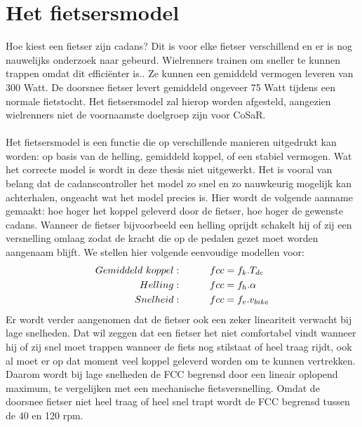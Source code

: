 \section{Het fietsersmodel}
Hoe kiest een fietser zijn cadans? Dit is voor elke fietser verschillend en er is nog nauwelijks onderzoek naar gebeurd. Wielrenners trainen om sneller te kunnen trappen omdat dit efficiënter is.. Ze kunnen een gemiddeld vermogen leveren van 300 Watt. De doorsnee fietser levert gemiddeld ongeveer 75 Watt tijdens een normale fietstocht. Het fietsersmodel zal hierop worden afgesteld, aangezien wielrenners niet de voornaamste doelgroep zijn voor CoSaR.
\\\\
Het fietsersmodel is een functie die op verschillende manieren uitgedrukt kan worden: op basis van de helling, gemiddeld koppel, of een stabiel vermogen. Wat het correcte model is wordt in deze thesis niet uitgewerkt. Het is vooral van belang dat de cadanscontroller het model zo snel en zo nauwkeurig mogelijk kan achterhalen, ongeacht wat het model precies is. Hier wordt de volgende aanname gemaakt: hoe hoger het koppel geleverd door de fietser, hoe hoger de gewenste cadans. Wanneer de fietser bijvoorbeeld een helling oprijdt schakelt hij of zij een versnelling omlaag zodat de kracht die op de pedalen gezet moet worden aangenaam blijft. We stellen hier volgende eenvoudige modellen voor:
\begin{align*}
Gemiddeld \ koppel:\hspace*{1cm} fcc &= f_k . T_{dc}\\
Helling:\hspace*{1cm} fcc &= f_h . \alpha\\
Snelheid:\hspace*{1cm} fcc &= f_v . v_{bike}
\end{align*}
Er wordt verder aangenomen dat de fietser ook een zeker lineariteit verwacht bij lage snelheden. Dat wil zeggen dat een fietser het niet comfortabel vindt wanneer hij of zij snel moet trappen wanneer de fiets nog stilstaat of heel traag rijdt, ook al moet er op dat moment veel koppel geleverd worden om te kunnen vertrekken. Daarom wordt bij lage snelheden de FCC begrensd door een lineair oplopend maximum, te vergelijken met een mechanische fietsversnelling. Omdat de doorsnee fietser niet heel traag of heel snel trapt wordt de FCC begrensd tussen de 40 en 120 rpm.
